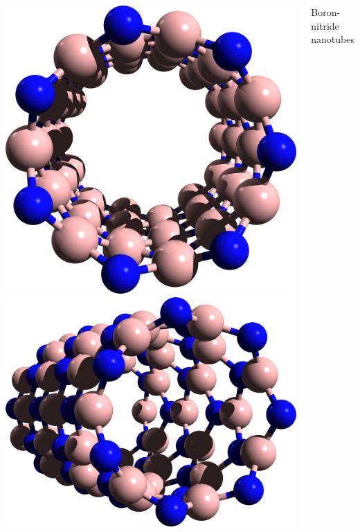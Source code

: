 \documentclass{beamer}
\begin{document}
\begin{frame}
\begin{columns}
\begin{columns}
\includegraphics[width=1.0\textwidth]{figs/7-bnnt-2.png}\\
\includegraphics[width=1.0\textwidth]{figs/7-bnnt-3.png}

\end{columns}

\begin{center}
Boron-nitride nanotubes
\end{center}


\end{columns}

\end{frame}
\end{document}
